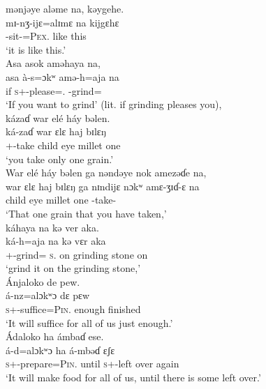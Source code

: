 \clearpage
\medskip
 mənjəye  aləme  na,  kəygehe.\\
\gll mɪ-nʒ-ijɛ=alɪmɛ     na  kijgɛhɛ\\
{\NOM}{}-sit-{\CL}=\textsc{Pex}.{\POSS}    {\PSP}  {like this}\\
\glt ‘it is like this.’\\

\medskip
 Asa  asok  aməhaya  na,\\
\gll asa   à-s=ɔkʷ amə-h=aja na\\
if     \textsc{s}+{\PFV}-please={\twoS}.{\IO}  {\DEP}-grind={\PLU}   {\PSP}\\
\glt ‘If you want to grind’ (lit. if grinding pleases you),\\

\medskip
 kázaɗ  war  elé  háy  bəlen.\\
\gll ká{}-zaɗ  war     ɛlɛ      haj       bɪlɛŋ\\
{\twoS}+{\IFV}-take  child  eye  millet  one\\
\glt ‘you take only one grain.’\\

\medskip
 War  elé  háy  bəlen  ga  nəndəye  nok  amezəɗe  na,\\
\gll war    ɛlɛ      haj     bɪlɛŋ  ga   nɪndijɛ  nɔkʷ amɛ-ʒɪɗ-ɛ na\\
child     eye  millet  one      {\ADJ}  {\DEM}    {\twoS}    {\DEP}-take-{\CL}      {\PSP}\\
\glt ‘That one grain that you have taken,’\\

\medskip
káhaya  na  kə  ver  aka.\\
\gll ká-h=aja   na       kə  vɛr        aka\\
{\twoS}+{\IFV}-grind={\PLU}  \textsc{s}.{\DO}  on   {grinding stone}  on\\
\glt ‘grind it on the grinding stone,’\\

\medskip
Ánjaloko  de  pew. \\
\gll á-nz=alɔkʷɔ dɛ     pɛw\\
\textsc{s}+{\IFV}-suffice=\textsc{Pin}.{\IO}    enough  finished\\
\glt ‘It will suffice for all of us just enough.’ \\

\medskip
 Ádaloko  ha  ámbaɗ  ese.\\
\gll á-d=alɔkʷɔ ha      á-mbəɗ ɛʃɛ\\
\textsc{s}+{\IFV}-prepare=\textsc{Pin}.{\IO}  until   {\textsc{s}+{\IFV}-left over}  again\\ 
\glt ‘It will make food for all of us, until there is some left over.’\\

